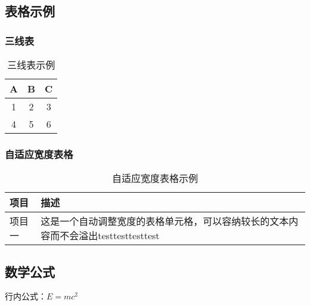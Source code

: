 \documentclass[12pt]{ctexart}
\begin{document}
\begin{sloppypar}
\subsection{表格示例}

\subsubsection{三线表}
\begin{table}[H]
    \centering
    \caption{三线表示例}
    \label{tab:example}
    \begin{tabular}{ccc}   %
        \toprule        %
        \textbf{A} & \textbf{B} & \textbf{C} \\
        \midrule        %
        1 & 2 & 3 \\
        4 & 5 & 6 \\
        \bottomrule     %
    \end{tabular}
\end{table}

\subsubsection{自适应宽度表格}
\begin{table}[H]
    \centering
    \caption{自适应宽度表格示例}
    \label{tab:adaptive}
    \begin{tabularx}{\textwidth}{|l|X|}  %
        \hline
        \textbf{项目} & \textbf{描述} \\
        \hline
        项目一 & 这是一个自动调整宽度的表格单元格，可以容纳较长的文本内容而不会溢出testtesttesttest \\
        \hline
    \end{tabularx}
\end{table}

\subsection{数学公式}
行内公式：$E=mc^2$


\end{sloppypar}
\end{document}
